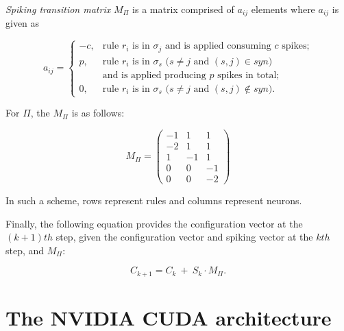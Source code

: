 \documentclass{svmultm}
\begin{document}
\textit{Spiking transition matrix} $M_{\Pi}$ is a matrix comprised of $a_{ij}$
elements where $a_{ij}$ is given as


\begin{definition}\label{defi-snp-mat}
$$
a_{ij} = \left\{
\begin{array}{rl}
-c, &\mbox{rule $r_i$ is in $\sigma_j$ and is applied consuming $c$ spikes;} \\
 p, &\mbox{rule $r_i$ is in $\sigma_s$ ($s\neq j$ and $(s,j)\in syn$)} \\
 & \mbox{and is applied producing $p$ spikes in total;}\\
 0, &\mbox{rule $r_i$ is in $\sigma_s$ ($s\neq j$ and $(s,j)\notin syn$).}
    \end{array}
\right.
$$
\end{definition}

For $\Pi$, the $M_{\Pi}$ is as follows:

\begin{equation}\label{snp_mat}
M_{\Pi} = \left(
\begin{array}{ccc}
  -1 & 1 & 1\\
  -2 & 1 &  1 \\
   1 &  -1 & 1 \\
   0 & 0 & -1\\
   0 & 0& -2
\end{array}\right)
\end{equation}

In such a scheme, rows represent rules and columns
represent neurons. 

Finally, the following equation provides the configuration
vector at the $(k+1)th$ step, given the configuration vector and
spiking vector at the $kth$ step, and $M_{\Pi}$:

\begin{equation}\label{next-config}
C_{k+1} =  C_{k} ~ + ~ S_{k}\cdot M_{\Pi}.
\end{equation}


\section{The NVIDIA CUDA architecture}

\end{document}
